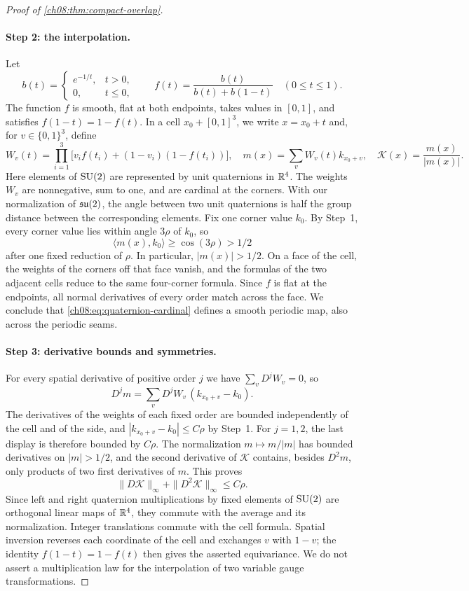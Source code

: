 \begin{proof}[Proof of \cref{ch08:thm:compact-overlap}]
\paragraph{Step 2: the interpolation.}
Let
\[
 b(t)=\begin{cases}e^{-1/t},&t>0,\\0,&t\le0,\end{cases}
 \qquad f(t)=\frac{b(t)}{b(t)+b(1-t)}\quad(0\le t\le1).
\]
The function $f$ is smooth, flat at both endpoints, takes values in $[0,1]$, and satisfies $f(1-t)=1-f(t)$. In a cell $x_0+[0,1]^3$, we write $x=x_0+t$ and, for $v\in\{0,1\}^3$, define
\begin{equation}\label{ch08:eq:quaternion-cardinal}
 W_v(t)=\prod_{i=1}^3
       \big[v_if(t_i)+(1-v_i)(1-f(t_i))\big],\quad
 m(x)=\sum_vW_v(t)k_{x_0+v},\quad
 \mathscr K(x)=\frac{m(x)}{|m(x)|}.
\end{equation}
Here elements of $\mathrm{SU}(2)$ are represented by unit quaternions in $\mathbb R^4$. The weights $W_v$ are nonnegative, sum to one, and are cardinal at the corners. With our normalization of $\mathfrak{su}(2)$, the angle between two unit quaternions is half the group distance between the corresponding elements. Fix one corner value $k_0$. By Step~1, every corner value lies within angle $3\rho$ of $k_0$, so
\[
 \langle m(x),k_0\rangle\ge\cos(3\rho)>1/2
\]
after one fixed reduction of $\rho$. In particular, $|m(x)|>1/2$. On a face of the cell, the weights of the corners off that face vanish, and the formulas of the two adjacent cells reduce to the same four-corner formula. Since $f$ is flat at the endpoints, all normal derivatives of every order match across the face. We conclude that \eqref{ch08:eq:quaternion-cardinal} defines a smooth periodic map, also across the periodic seams.

\paragraph{Step 3: derivative bounds and symmetries.}
For every spatial derivative of positive order $j$ we have $\sum_vD^jW_v=0$, so
\[
 D^jm=\sum_vD^jW_v\,(k_{x_0+v}-k_0).
\]
The derivatives of the weights of each fixed order are bounded independently of the cell and of the side, and $|k_{x_0+v}-k_0|\le C\rho$ by Step~1. For $j=1,2$, the last display is therefore bounded by $C\rho$. The normalization $m\mapsto m/|m|$ has bounded derivatives on $|m|>1/2$, and the second derivative of $\mathscr K$ contains, besides $D^2m$, only products of two first derivatives of $m$. This proves
\begin{equation}\label{ch08:eq:compact-lift-derivatives}
 \|D\mathscr K\|_\infty+\|D^2\mathscr K\|_\infty\le C\rho.
\end{equation}
Since left and right quaternion multiplications by fixed elements of $\mathrm{SU}(2)$ are orthogonal linear maps of $\mathbb R^4$, they commute with the average and its normalization. Integer translations commute with the cell formula. Spatial inversion reverses each coordinate of the cell and exchanges $v$ with $1-v$; the identity $f(1-t)=1-f(t)$ then gives the asserted equivariance. We do not assert a multiplication law for the interpolation of two variable gauge transformations.


\end{proof}
